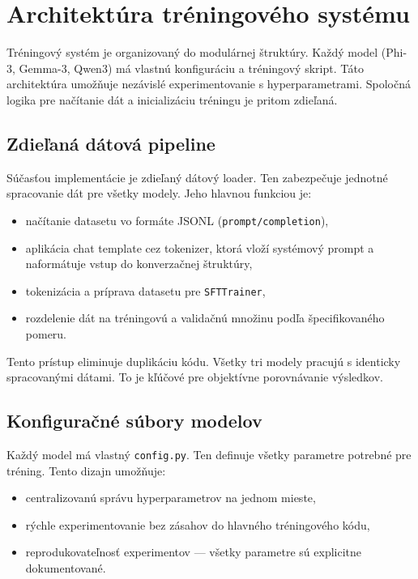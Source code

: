 \section{Architektúra tréningového systému}
 
Tréningový systém je organizovaný do modulárnej štruktúry. Každý model (Phi-3, Gemma-3, Qwen3) má vlastnú konfiguráciu a tréningový skript. Táto architektúra umožňuje nezávislé experimentovanie s hyperparametrami. Spoločná logika pre načítanie dát a inicializáciu tréningu je pritom zdieľaná.
 
\subsection{Zdieľaná dátová pipeline}
 
Súčasťou implementácie je zdieľaný dátový loader. Ten zabezpečuje jednotné spracovanie dát pre všetky modely. Jeho hlavnou funkciou je:
\begin{itemize}
    \item načítanie datasetu vo formáte JSONL (\texttt{prompt/completion}),
    \item aplikácia chat template cez tokenizer, ktorá vloží systémový prompt a naformátuje vstup do konverzačnej štruktúry,
    \item tokenizácia a príprava datasetu pre \texttt{SFTTrainer},
    \item rozdelenie dát na tréningovú a validačnú množinu podľa špecifikovaného pomeru.
\end{itemize}
 
Tento prístup eliminuje duplikáciu kódu. Všetky tri modely pracujú s identicky spracovanými dátami. To je kľúčové pre objektívne porovnávanie výsledkov.
 
\subsection{Konfiguračné súbory modelov}
 
Každý model má vlastný \texttt{config.py}. Ten definuje všetky parametre potrebné pre tréning. Tento dizajn umožňuje:
\begin{itemize}
    \item centralizovanú správu hyperparametrov na jednom mieste,
    \item rýchle experimentovanie bez zásahov do hlavného tréningového kódu,
    \item reprodukovateľnosť experimentov — všetky parametre sú explicitne dokumentované.
\end{itemize}
 
